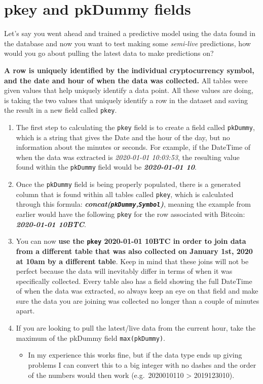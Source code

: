 \documentclass[
]{book}
\providecommand{\tightlist}{%
  \setlength{\itemsep}{0pt}\setlength{\parskip}{0pt}}
\begin{document}
\hypertarget{pkey-and-pkdummy-fields}{%
\section{pkey and pkDummy fields}\label{pkey-and-pkdummy-fields}}

Let's say you went ahead and trained a predictive model using the data found in the database and now you want to test making some \emph{semi-live} predictions, how would you go about pulling the latest data to make predictions on?

\textbf{A row is uniquely identified by the individual cryptocurrency symbol, and the date and hour of when the data was collected.} All tables were given values that help uniquely identify a data point. All these values are doing, is taking the two values that uniquely identify a row in the dataset and saving the result in a new field called \texttt{pkey}.

\begin{enumerate}
\def\labelenumi{\arabic{enumi}.}
\item
  The first step to calculating the \texttt{pkey} field is to create a field called \texttt{pkDummy}, which is a string that gives the Date and the hour of the day, but no information about the minutes or seconds. For example, if the DateTime of when the data was extracted is \emph{2020-01-01 10:03:53}, the resulting value found within the \texttt{pkDummy} field would be \textbf{\emph{2020-01-01 10}}.
\item
  Once the \texttt{pkDummy} field is being properly populated, there is a generated column that is found within all tables called \texttt{pkey}, which is calculated through this formula: \textbf{\emph{concat(\texttt{pkDummy},\texttt{Symbol})}}, meaning the example from earlier would have the following \texttt{pkey} for the row associated with Bitcoin: \textbf{\emph{2020-01-01 10BTC}}.
\item
  You can now \textbf{use the \texttt{pkey} 2020-01-01 10BTC in order to join data from a different table that was also collected on January 1st, 2020 at 10am by a different table}. Keep in mind that these joins will not be perfect because the data will inevitably differ in terms of when it was specifically collected. Every table also has a field showing the full DateTime of when the data was extracted, so always keep an eye on that field and make sure the data you are joining was collected no longer than a couple of minutes apart.
\item
  If you are looking to pull the latest/live data from the current hour, take the maximum of the pkDummy field \texttt{max(pkDummy)}.

  \begin{itemize}
  \tightlist
  \item
    In my experience this works fine, but if the data type ends up giving problems I can convert this to a big integer with no dashes and the order of the numbers would then work (e.g.~2020010110 \textgreater{} 2019123010).
  \end{itemize}
\end{enumerate}
\end{document}
